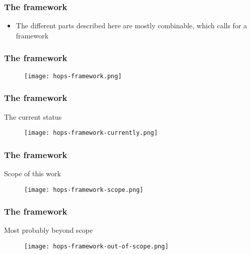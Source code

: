 \begin{frame}
    \frametitle{The framework}
    \begin{itemize}
	\item The different parts described here are mostly combinable, which calls for a framework
    \end{itemize}
\end{frame}

\begin{frame}
    \frametitle{The framework}
    \phantom{bla}
    \begin{figure}
	\texttt{[image: hops-framework.png]}
    \end{figure}
\end{frame}

\begin{frame}
    \frametitle{The framework}
    The current status
    \begin{figure}
	\texttt{[image: hops-framework-currently.png]}
    \end{figure}
\end{frame}

\begin{frame}
    \frametitle{The framework}
    Scope of this work
    \begin{figure}
	\texttt{[image: hops-framework-scope.png]}
    \end{figure}
\end{frame}

\begin{frame}
    \frametitle{The framework}
    Most probably beyond scope
    \begin{figure}
	\texttt{[image: hops-framework-out-of-scope.png]}
    \end{figure}
\end{frame}

